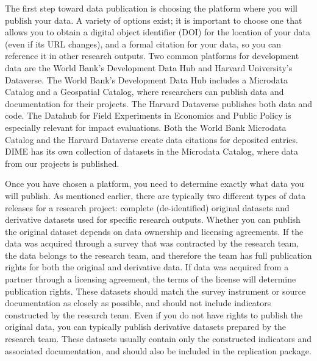 The first step toward data publication is choosing the platform where you will publish your data.
A variety of options exist;
it is important to choose one that allows you to obtain a digital object identifier (DOI)
for the location of your data (even if its URL changes),
and a formal citation for your data, so you can reference it in other research outputs.
Two common platforms for development data are the World Bank's Development Data Hub
and Harvard University's Dataverse.
The World Bank's Development Data Hub
includes a Microdata Catalog
and a Geospatial Catalog,
where researchers can publish data and documentation for their projects.
The Harvard Dataverse
publishes both data and code.
The Datahub for Field Experiments in Economics and Public Policy
is especially relevant for impact evaluations.
Both the World Bank Microdata Catalog and the Harvard Dataverse
create data citations for deposited entries.
DIME has its own collection of datasets in the Microdata Catalog,
where data from our projects is published.

Once you have chosen a platform, you need to determine exactly what data you will publish.
As mentioned earlier, there are typically two different types of data releases for a research project:
complete (de-identified) original datasets and derivative datasets used for specific research outputs.
Whether you can publish the original dataset depends on data ownership and licensing agreements.
If the data was acquired through a survey that was contracted by the research team,
the data belongs to the research team,
and therefore the team has full publication rights for both the original and derivative data.
If data was acquired from a partner through a licensing agreement,
the terms of the license will determine publication rights.
These datasets should match the survey instrument or source documentation as closely as possible,
and should not include indicators constructed by the research team.
Even if you do not have rights to publish the original data,
you can typically publish derivative datasets prepared by the research team.
These datasets usually contain only the constructed indicators and associated documentation,
and should also be included in the replication package.

